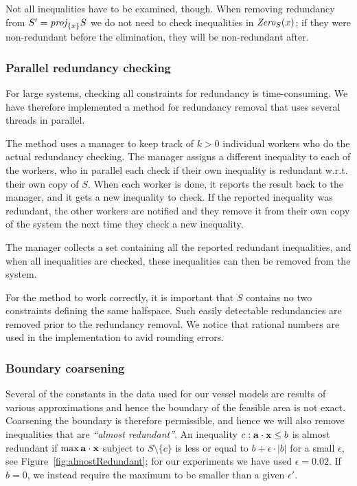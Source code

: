 Not all inequalities have to be examined, though. When removing redundancy from $S' = \mathit{proj}_{\{x\}}S$ we do not need to check inequalities in $\mathit{Zero}_S(x)$; if they were non-redundant before the elimination, they will be non-redundant after.

\subsubsection{Parallel redundancy checking}
For large systems, checking all constraints for redundancy is time-consuming. We have therefore implemented a method for redundancy removal that uses several threads in parallel. 

The method uses a manager to keep track of $k>0$ individual workers who do the actual redundancy checking.
The manager assigns a different inequality to each of the workers, who in parallel each check if their own inequality is redundant w.r.t. their own copy of $S$. When each worker is done, it reports the result back to the manager, and it gets a new inequality to check.  
If the reported inequality was redundant, the other workers are notified and they remove it from their own copy of the system the next time they check a new inequality. 

The manager collects a set containing all the reported redundant inequalities, and when all inequalities are checked, these inequalities can then be removed from the system.

For the method to work correctly, it is important that $S$ contains no two constraints defining the same halfspace. Such easily detectable redundancies are removed prior to the redundancy removal. We notice that rational numbers are used in the implementation to avid rounding errors. 

\subsubsection{Boundary coarsening} 
Several of the constants in the data used for our vessel models are results of various approximations and hence the boundary of the feasible area is not exact. Coarsening the boundary is therefore permissible, and hence we will also remove inequalities that are \emph{``almost redundant''}. An inequality $c: \mathbf{a}\cdot\mathbf{x}\leq b$ is almost redundant if $\max \mathbf{a}\cdot\mathbf{x}$  subject to $S\setminus\{c\}$ is less or equal to $b + \epsilon\cdot |b|$ for a small $\epsilon$, see Figure~\ref{fig:almostRedundant}; for our experiments we have used $\epsilon = 0.02$. If $b=0$, we instead require the maximum to be smaller than a given $\epsilon'$. 


